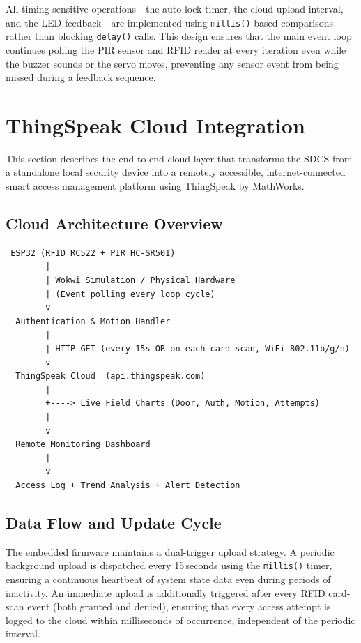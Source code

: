 \documentclass[12pt,a4paper]{article}
\begin{document}
All timing-sensitive operations---the auto-lock timer, the cloud upload
interval, and the LED feedback---are implemented using
\texttt{millis()}-based comparisons rather than blocking \texttt{delay()}
calls. This design ensures that the main event loop continues polling
the PIR sensor and RFID reader at every iteration even while the buzzer
sounds or the servo moves, preventing any sensor event from being missed
during a feedback sequence.

\section{ThingSpeak Cloud Integration}
\label{sec:cloud}

This section describes the end-to-end cloud
layer that transforms the SDCS from a standalone local security
device into a remotely accessible, internet-connected smart access
management platform using ThingSpeak by MathWorks.


\subsection{Cloud Architecture Overview}

\begin{center}
\begin{mdframed}[style=cloudbox]
\begin{verbatim}
 ESP32 (RFID RC522 + PIR HC-SR501)
        |
        | Wokwi Simulation / Physical Hardware
        | (Event polling every loop cycle)
        v
  Authentication & Motion Handler
        |
        | HTTP GET (every 15s OR on each card scan, WiFi 802.11b/g/n)
        v
  ThingSpeak Cloud  (api.thingspeak.com)
        |
        +----> Live Field Charts (Door, Auth, Motion, Attempts)
        |
        v
  Remote Monitoring Dashboard
        |
        v
  Access Log + Trend Analysis + Alert Detection
\end{verbatim}
\end{mdframed}
\end{center}

\subsection{Data Flow and Update Cycle}

The embedded firmware maintains a dual-trigger upload strategy. A
periodic background upload is dispatched every 15\,seconds using
the \texttt{millis()} timer, ensuring a continuous heartbeat of
system state data even during periods of inactivity. An immediate
upload is additionally triggered after every RFID card-scan event
(both granted and denied), ensuring that every access attempt is
logged to the cloud within milliseconds of occurrence, independent
of the periodic interval.
\end{document}
